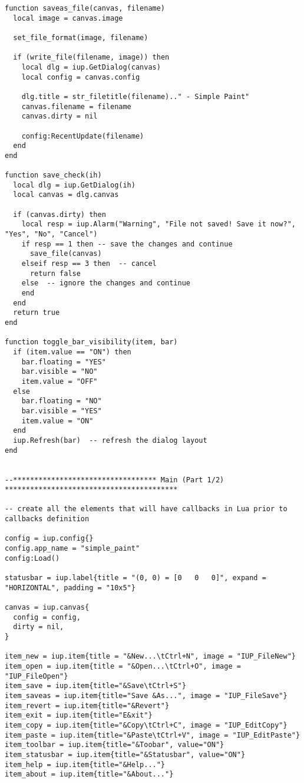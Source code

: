 \documentclass{ctexart}
\begin{document}
\begin{lstlisting}
function saveas_file(canvas, filename)
  local image = canvas.image

  set_file_format(image, filename)

  if (write_file(filename, image)) then
    local dlg = iup.GetDialog(canvas)
    local config = canvas.config
    
    dlg.title = str_filetitle(filename).." - Simple Paint"
    canvas.filename = filename
    canvas.dirty = nil
    
    config:RecentUpdate(filename)
  end
end

function save_check(ih)
  local dlg = iup.GetDialog(ih)
  local canvas = dlg.canvas
  
  if (canvas.dirty) then
    local resp = iup.Alarm("Warning", "File not saved! Save it now?", "Yes", "No", "Cancel")
    if resp == 1 then -- save the changes and continue
      save_file(canvas)
    elseif resp == 3 then  -- cancel
      return false
    else  -- ignore the changes and continue
    end
  end
  return true
end

function toggle_bar_visibility(item, bar)
  if (item.value == "ON") then
    bar.floating = "YES"
    bar.visible = "NO"
    item.value = "OFF"
  else
    bar.floating = "NO"
    bar.visible = "YES"
    item.value = "ON"
  end
  iup.Refresh(bar)  -- refresh the dialog layout
end


--********************************** Main (Part 1/2) *****************************************

-- create all the elements that will have callbacks in Lua prior to callbacks definition

config = iup.config{}
config.app_name = "simple_paint"
config:Load()

statusbar = iup.label{title = "(0, 0) = [0   0   0]", expand = "HORIZONTAL", padding = "10x5"}

canvas = iup.canvas{
  config = config,
  dirty = nil,
}

item_new = iup.item{title = "&New...\tCtrl+N", image = "IUP_FileNew"}
item_open = iup.item{title = "&Open...\tCtrl+O", image = "IUP_FileOpen"}
item_save = iup.item{title="&Save\tCtrl+S"}
item_saveas = iup.item{title="Save &As...", image = "IUP_FileSave"}
item_revert = iup.item{title="&Revert"}
item_exit = iup.item{title="E&xit"}
item_copy = iup.item{title="&Copy\tCtrl+C", image = "IUP_EditCopy"}
item_paste = iup.item{title="&Paste\tCtrl+V", image = "IUP_EditPaste"}
item_toolbar = iup.item{title="&Toobar", value="ON"}
item_statusbar = iup.item{title="&Statusbar", value="ON"}
item_help = iup.item{title="&Help..."}
item_about = iup.item{title="&About..."}


\end{lstlisting}
\end{document}
